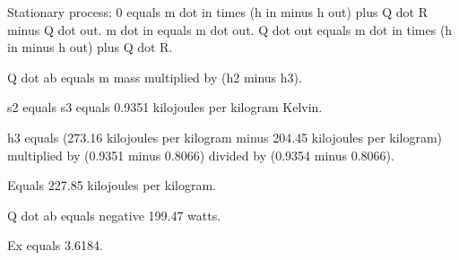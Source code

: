 Stationary process:  
0 equals m dot in times (h in minus h out) plus Q dot R minus Q dot out.  
m dot in equals m dot out.  
Q dot out equals m dot in times (h in minus h out) plus Q dot R.

Q dot ab equals m mass multiplied by (h2 minus h3).  

s2 equals s3 equals 0.9351 kilojoules per kilogram Kelvin.  

h3 equals (273.16 kilojoules per kilogram minus 204.45 kilojoules per kilogram) multiplied by (0.9351 minus 0.8066) divided by (0.9354 minus 0.8066).  

Equals 227.85 kilojoules per kilogram.  

Q dot ab equals negative 199.47 watts.  

Ex equals 3.6184.